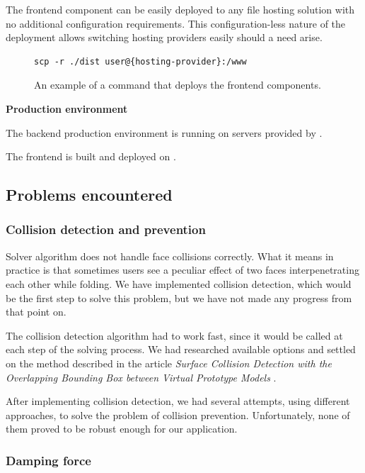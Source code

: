 The frontend component can be easily deployed to any file hosting solution with no additional configuration requirements.
This configuration-less nature of the deployment allows switching hosting providers easily should a need arise.

\begin{figure}[H]
	\caption{An example of a command that deploys the frontend components.}
	\begin{lstlisting}
scp -r ./dist user@{hosting-provider}:/www 
	\end{lstlisting}
\end{figure}
\medskip

\textbf{Production environment}

The backend production environment is running on servers provided by .

\medskip
The frontend is built and deployed on .


\subsection{Problems encountered}
\subsubsection{Collision detection and prevention}

Solver algorithm does not handle face collisions correctly.
What it means in practice is that sometimes users see a peculiar effect 
of two faces interpenetrating each other while folding.
We have implemented collision detection, which would be the first step to solve this problem,
but we have not made any progress from that point on. 

The collision detection algorithm had to work fast, since it would be called at each step of the solving process. 
We had researched available options and settled on the method described in the article
\textit{Surface Collision Detection with the Overlapping Bounding Box between Virtual Prototype Models} \cite{collision-detection}.

After implementing collision detection, we had several attempts, using different approaches, to 
solve the problem of collision prevention. Unfortunately, none of them proved to be robust enough for our application.

\subsubsection{Damping force}

